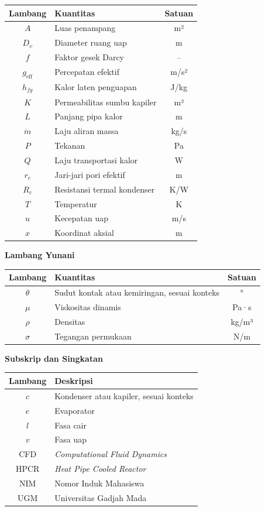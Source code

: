 \documentclass[
  12pt,a4paper,oneside]{report}
\begin{document}
\begin{longtable}[]{@{}clc@{}}
\toprule
Lambang & Kuantitas & Satuan \\
\midrule
\endhead
\(A\) & Luas penampang & m² \\
\(D_v\) & Diameter ruang uap & m \\
\(f\) & Faktor gesek Darcy & -- \\
\(g_{\mathrm{eff}}\) & Percepatan efektif & m/s² \\
\(h_{fg}\) & Kalor laten penguapan & J/kg \\
\(K\) & Permeabilitas sumbu kapiler & m² \\
\(L\) & Panjang pipa kalor & m \\
\(\dot m\) & Laju aliran massa & kg/s \\
\(P\) & Tekanan & Pa \\
\(Q\) & Laju transportasi kalor & W \\
\(r_c\) & Jari-jari pori efektif & m \\
\(R_c\) & Resistansi termal kondenser & K/W \\
\(T\) & Temperatur & K \\
\(u\) & Kecepatan uap & m/s \\
\(x\) & Koordinat aksial & m \\
\bottomrule
\end{longtable}

\textbf{Lambang Yunani}

\begin{longtable}[]{@{}clc@{}}
\toprule
Lambang & Kuantitas & Satuan \\
\midrule
\endhead
\(\theta\) & Sudut kontak atau kemiringan, sesuai konteks & ° \\
\(\mu\) & Viskositas dinamis & Pa·s \\
\(\rho\) & Densitas & kg/m³ \\
\(\sigma\) & Tegangan permukaan & N/m \\
\bottomrule
\end{longtable}

\textbf{Subskrip dan Singkatan}

\begin{longtable}[]{@{}cl@{}}
\toprule
Lambang & Deskripsi \\
\midrule
\endhead
\(c\) & Kondenser atau kapiler, sesuai konteks \\
\(e\) & Evaporator \\
\(l\) & Fasa cair \\
\(v\) & Fasa uap \\
CFD & \emph{Computational Fluid Dynamics} \\
HPCR & \emph{Heat Pipe Cooled Reactor} \\
NIM & Nomor Induk Mahasiswa \\
UGM & Universitas Gadjah Mada \\
\bottomrule
\end{longtable}
\end{document}
